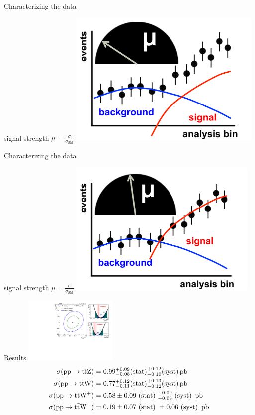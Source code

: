 \documentclass[professionalfont,fleqn]{beamer}
\begin{document}
\begin{frame}{Characterizing the data}
  \addtocounter{framenumber}{-1}
  \centering
  signal strength $\mu=\frac{\sigma}{\sigma_\text{SM}}$
  \includegraphics[height=6.5cm]{figures/cartoon-2}
\end{frame}

\begin{frame}{Characterizing the data}
  \addtocounter{framenumber}{-1}
  \centering
  signal strength $\mu=\frac{\sigma}{\sigma_\text{SM}}$
  \includegraphics[height=6.5cm]{figures/cartoon-3}
\end{frame}

\begin{frame}{Results}
  \centering
\includegraphics[width=4.5cm]{figures/thirteen-TeV/sm-2d-only}
\begin{align*}
  \sigma(\text{pp} \rightarrow \text{t}\bar{\text{t}}\text{Z}) &= 0.99^{+0.09}_{-0.08}\text{(stat)}^{+0.12}_{-0.10}\text{(syst)}\,\text{pb} \\
  \sigma(\text{pp} \rightarrow \text{t}\bar{\text{t}}\text{W}) &= 0.77^{+0.12}_{-0.11}\text{(stat)}^{+0.13}_{-0.12}\text{(syst)}\,\text{pb} \\
  \sigma(\text{pp} \rightarrow \text{t}\bar{\text{t}}\text{W}^{+}) &= 0.58\pm{0.09}\text{ (stat) }^{+0.09}_{-0.08}\text{ (syst) }\,\text{pb} \\
  \sigma(\text{pp} \rightarrow \text{t}\bar{\text{t}}\text{W}^{-}) &= 0.19\pm{0.07}\text{ (stat) }\pm{0.06}\text{ (syst) }\,\text{pb}
\end{align*}
\end{frame}
\end{document}
